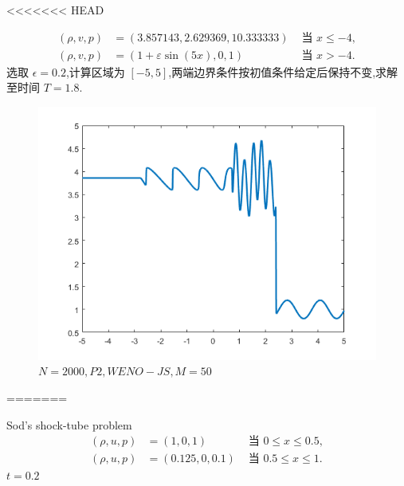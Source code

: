 \documentclass{book}
\begin{document}
\begin{example}
\begin{example}{}{}
\begin{example}
\begin{example}
\begin{example}
\begin{example}
\begin{example}{}{}
<<<<<<< HEAD
\begin{example}
    \begin{equation}
        \begin{aligned}
            (\rho, v, p) & =(3.857143,2.629369,10.333333)   & \text { 当 } x \leq-4, \\
            (\rho, v, p) & =(1+\varepsilon \sin (5 x), 0,1) & \text { 当 } x>-4 .
        \end{aligned}
    \end{equation}
    选取 $\epsilon = 0.2$,计算区域为 $[-5,5]$,两端边界条件按初值条件给定后保持不变,求解至时间 $T=1.8$.
    \begin{figure}[htp]
        \centering
        \label{fig:shu_Osher}
        \includegraphics[width=0.7\linewidth]{fig/Shu_Osher.png}
        \caption{$N=2000,P2,WENO-JS,M=50$}
    \end{figure}
    =======
\end{example}
\begin{example}{Sod's shock-tube problem\cite{RN204}}{}
    \begin{equation}
        \begin{aligned}
            (\rho, u, p) & =(1,0,1)       & \text { 当 }0\leqslant x \leq 0.5,      \\
            (\rho, u, p) & =(0.125,0,0.1) & \text { 当 }0.5\leqslant x\leqslant 1 .
        \end{aligned}
    \end{equation}
    $t=0.2$


\end{example}
\end{example}
\end{example}
\end{example}
\end{example}
\end{example}
\end{example}
\end{example}
\end{document}
